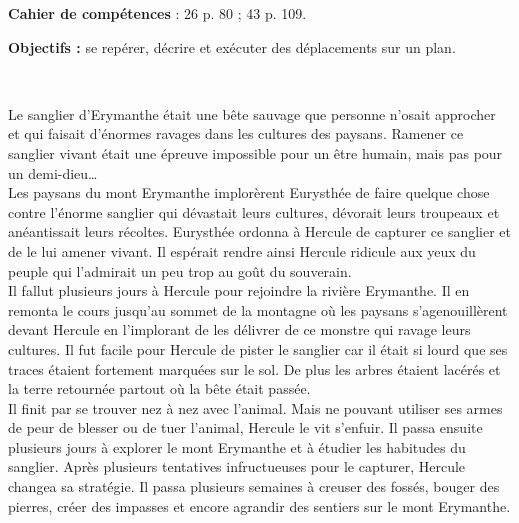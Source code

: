 \textcolor{PartieGeometrie}{\sffamily\bfseries Cahier de compétences} : 26 p. 80 ; 43 p. 109.


\activites

\begin{activite}
   {\bf Objectifs :} se repérer, décrire et exécuter des déplacements sur un plan.
   \begin{QCM}
         \ \\
         \hspace*{1cm}
         \begin{minipage}{14CM}
            Le sanglier d’Erymanthe était une bête sauvage que personne n’osait approcher et qui faisait d’énormes ravages dans les cultures des paysans. Ramener ce sanglier vivant était une épreuve impossible pour un être humain, mais pas pour un demi-dieu\dots \\
            
            Les paysans du mont Erymanthe implorèrent Eurysthée de faire quelque chose contre l’énorme sanglier qui dévastait leurs cultures, dévorait leurs troupeaux et anéantissait leurs récoltes. Eurysthée ordonna à Hercule de capturer ce sanglier et de le lui amener vivant. Il espérait rendre ainsi Hercule ridicule aux yeux du peuple qui l’admirait un peu trop au goût du souverain. \\
            
            Il fallut plusieurs jours à Hercule pour rejoindre la rivière Erymanthe. Il en remonta le cours jusqu’au sommet de la montagne où les paysans s’agenouillèrent devant Hercule en l’implorant de les délivrer de ce monstre qui ravage leurs cultures. Il fut facile pour Hercule de pister le sanglier car il était si lourd que ses traces étaient fortement marquées sur le sol. De plus les arbres étaient lacérés et la terre retournée partout où la bête était passée. \\
            
             Il finit par se trouver nez à nez avec l’animal. Mais ne pouvant utiliser ses armes de peur de blesser ou de tuer l’animal, Hercule le vit s’enfuir. Il passa ensuite plusieurs jours à explorer le mont Erymanthe et à étudier les habitudes du sanglier. Après plusieurs tentatives infructueuses pour le capturer, Hercule changea sa stratégie. Il passa plusieurs semaines à creuser des fossés, bouger des pierres, créer des impasses et encore agrandir des sentiers sur le mont Erymanthe. \\
             

\end{minipage}
\end{QCM}
\end{activite}
